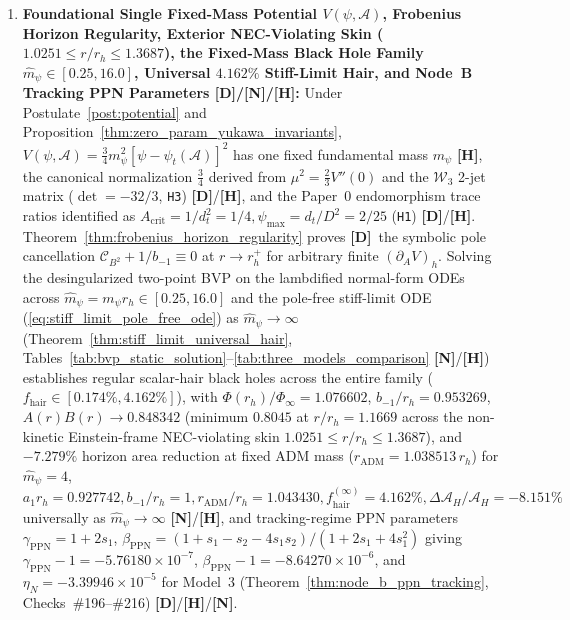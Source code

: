\documentclass[11pt,a4paper]{article}
\newcommand{\catD}{\textbf{\textcolor{blue!75!black}{[D]}}}
\newcommand{\catH}{\textbf{\textcolor{orange!85!black}{[H]}}}
\newcommand{\catN}{\textbf{\textcolor{teal!75!black}{[N]}}}
\theoremstyle{definition}
\theoremstyle{remark}
\begin{document}
\begin{enumerate}
  \item \textbf{Foundational Single Fixed-Mass Potential $V(\psi, \mathcal{A})$, Frobenius Horizon Regularity, Exterior NEC-Violating Skin ($1.0251 \le r/r_h \le 1.3687$), the Fixed-Mass Black Hole Family $\hat{m}_{\psi} \in [0.25, 16.0]$, Universal $4.162\%$ Stiff-Limit Hair, and Node~B Tracking PPN Parameters \catD/\catN/\catH:} Under Postulate~\ref{post:potential} and Proposition~\ref{thm:zero_param_yukawa_invariants}, $V(\psi, \mathcal{A}) = \frac{3}{4}m_{\psi}^2[\psi - \psi_t(\mathcal{A})]^2$ has one fixed fundamental mass $m_{\psi}$ \catH, the canonical normalization $\frac{3}{4}$ derived from $\mu^2 = \frac{2}{3}V''(0)$ and the $\mathcal{W}_3$ 2-jet matrix ($\det = -32/3$, \texttt{H3}) \catD/\catH, and the Paper~0 endomorphism trace ratios identified as $A_{\text{crit}} = 1/d_t^2 = 1/4, \psi_{\max} = d_t/D^2 = 2/25$ (\texttt{H1}) \catD/\catH. Theorem~\ref{thm:frobenius_horizon_regularity} proves \catD\ the symbolic pole cancellation $\mathcal{C}_{B^2} + 1/b_{-1} \equiv 0$ at $r \to r_h^+$ for arbitrary finite $(\partial_A V)_h$. Solving the desingularized two-point BVP on the lambdified normal-form ODEs across $\hat{m}_{\psi} = m_{\psi}r_h \in [0.25, 16.0]$ and the pole-free stiff-limit ODE (\ref{eq:stiff_limit_pole_free_ode}) as $\hat{m}_{\psi} \to \infty$ (Theorem~\ref{thm:stiff_limit_universal_hair}, Tables~\ref{tab:bvp_static_solution}--\ref{tab:three_models_comparison} \catN/\catH) establishes regular scalar-hair black holes across the entire family ($f_{\text{hair}} \in [0.174\%, 4.162\%]$), with $\Phi(r_h)/\Phi_{\infty} = 1.076602$, $b_{-1}/r_h = 0.953269$, $A(r)B(r) \to 0.848342$ (minimum $0.8045$ at $r/r_h = 1.1669$ across the non-kinetic Einstein-frame NEC-violating skin $1.0251 \le r/r_h \le 1.3687$), and $-7.279\%$ horizon area reduction at fixed ADM mass ($r_{\text{ADM}} = 1.038513\,r_h$) for $\hat{m}_{\psi} = 4$, $a_1 r_h = 0.927742, b_{-1}/r_h = 1, r_{\text{ADM}}/r_h = 1.043430, f_{\text{hair}}^{(\infty)} = \mathbf{4.162\%}, \Delta\mathcal{A}_H/\mathcal{A}_H = \mathbf{-8.151\%}$ universally as $\hat{m}_{\psi} \to \infty$ \catN/\catH, and tracking-regime PPN parameters $\gamma_{\text{PPN}} = 1 + 2s_1$, $\beta_{\text{PPN}} = (1 + s_1 - s_2 - 4s_1 s_2)/(1 + 2s_1 + 4s_1^2)$ giving $\gamma_{\text{PPN}} - 1 = -5.76180 \times 10^{-7}$, $\beta_{\text{PPN}} - 1 = -8.64270 \times 10^{-6}$, and $\eta_N = -3.39946 \times 10^{-5}$ for Model~3 (Theorem~\ref{thm:node_b_ppn_tracking}, Checks~\#196--\#216) \catD/\catH/\catN.

\end{enumerate}
\end{document}
